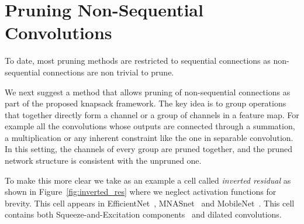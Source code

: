 \documentclass{article}
\begin{document}
\vspace{-10pt} 
\section{Pruning Non-Sequential Convolutions}
\vspace{-5pt} 
\label{sec:gmcc}
To date, most pruning methods are restricted to sequential connections as non-sequential connections are non trivial to prune.



We next suggest a method that allows pruning of non-sequential connections as part of the proposed knapsack framework. 
The key idea is to group operations that together directly form a channel or a group of channels in a feature map. For example all the convolutions whose outputs are connected through a summation, a multiplication or any inherent constraint like the one in separable convolution.
In this setting, the channels of every group are pruned together, and the pruned network structure is consistent with the unpruned one.

To make this more clear we take as an example a cell called {\it inverted residual} as shown in Figure~\ref{fig:inverted_res} where we neglect activation functions for brevity.
This cell appears in EfficientNet~\cite{EfficientNet}, MNASnet~\cite{Mnas} and MobileNet~\cite{mobilenetv3}.
This cell contains both Squeeze-and-Excitation components~\cite{hu2018senet} and dilated convolutions. 
\end{document}
